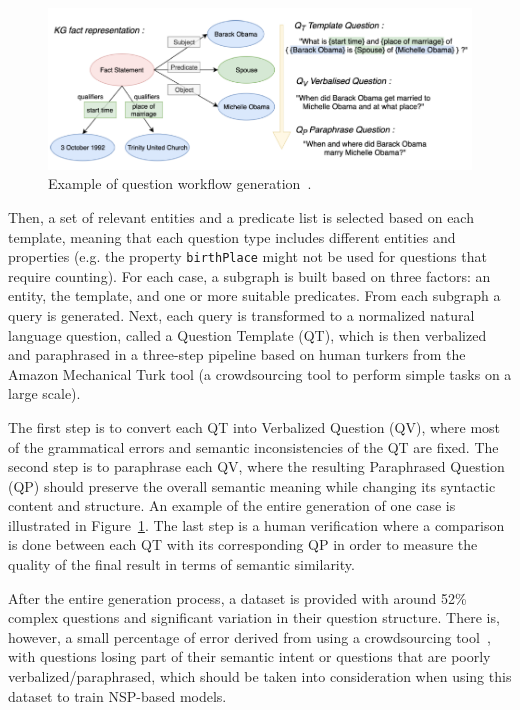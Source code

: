 \begin{figure}[!h]
    \centering
    \includegraphics[scale=.55]{imagenes/2_theorical_framework/question_answering/lcquad2Workflow.PNG}
    \caption{Example of \LCQuADtwo{} question workflow generation~\cite{dataset:lcquad2-DubeyBA019}.}
    \label{fig:lcquad2Pipeline}
\end{figure}

Then, a set of relevant entities and a predicate list is selected based on each \SPARQL{} template, 
meaning that each question type includes different entities and properties (e.g. the property 
\texttt{birthPlace} might not be used for questions that require counting). For each case, a 
subgraph is built based on three factors: an entity, the \SPARQL{} template, and one or more 
suitable predicates. From each subgraph a \SPARQL{} query is generated. Next, each \SPARQL{} query is 
transformed to a normalized natural language question, called a Question Template (QT), which is 
then verbalized and paraphrased in a three-step pipeline based on human turkers from the Amazon 
Mechanical Turk tool (a crowdsourcing tool to perform simple tasks on a large scale). 

The first step is to convert each QT into Verbalized Question (QV), where most of the 
grammatical errors and semantic inconsistencies of the QT are fixed. The second step is to 
paraphrase each QV, where the resulting Paraphrased Question (QP) should preserve the overall 
semantic meaning while changing its syntactic content and structure. An example of the entire 
generation of one case is illustrated in Figure~\ref{fig:lcquad2Pipeline}. The last step is a 
human verification where a comparison is done between each QT with its corresponding QP in 
order to measure the quality of the final result in terms of semantic similarity.

After the entire generation process, a dataset is provided with around 52\% complex questions 
and significant variation in their  question structure. There is, however, a small percentage 
of error derived from using a crowdsourcing tool~\cite{dataset:lcquad2-DubeyBA019}, with questions 
losing part of their semantic intent or questions that are poorly verbalized/paraphrased, which 
should be taken into consideration when using this dataset to train NSP-based models. 
